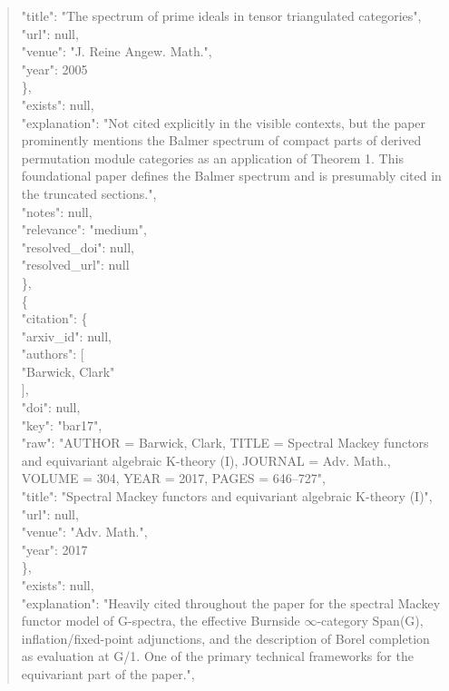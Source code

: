 \documentclass[11pt]{article}
\begin{document}
\begin{quote}
        "title": "The spectrum of prime ideals in tensor triangulated categories",\\
        "url": null,\\
        "venue": "J. Reine Angew. Math.",\\
        "year": 2005\\
      \},\\
      "exists": null,\\
      "explanation": "Not cited explicitly in the visible contexts, but the paper prominently mentions the Balmer spectrum of compact parts of derived permutation module categories as an application of Theorem 1. This foundational paper defines the Balmer spectrum and is presumably cited in the truncated sections.",\\
      "notes": null,\\
      "relevance": "medium",\\
      "resolved\_doi": null,\\
      "resolved\_url": null\\
    \},\\
    \{\\
      "citation": \{\\
        "arxiv\_id": null,\\
        "authors": [\\
          "Barwick, Clark"\\
        ],\\
        "doi": null,\\
        "key": "bar17",\\
        "raw": "AUTHOR = Barwick, Clark, TITLE = Spectral Mackey functors and equivariant algebraic K-theory (I), JOURNAL = Adv. Math., VOLUME = 304, YEAR = 2017, PAGES = 646--727",\\
        "title": "Spectral Mackey functors and equivariant algebraic K-theory (I)",\\
        "url": null,\\
        "venue": "Adv. Math.",\\
        "year": 2017\\
      \},\\
      "exists": null,\\
      "explanation": "Heavily cited throughout the paper for the spectral Mackey functor model of G-spectra, the effective Burnside \ensuremath{\infty}-category Span(G), inflation/fixed-point adjunctions, and the description of Borel completion as evaluation at G/1. One of the primary technical frameworks for the equivariant part of the paper.",\\

\end{quote}
\end{document}
